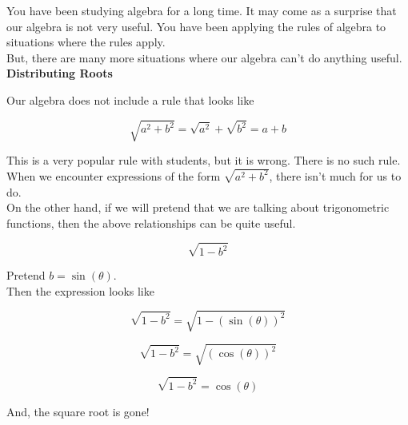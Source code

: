\documentclass{ximera}
\begin{document}
You have been studying algebra for a long time.  It may come as a surprise that our algebra is not very useful.  You have been applying the rules of algebra to situations where the rules apply. \\


But, there are many more situations where our algebra can't do anything useful. \\



\textbf{Distributing Roots}


Our algebra does not include a rule that looks like  

\[
\sqrt{a^2 + b^2} = \sqrt{a^2} + \sqrt{b^2} = a + b
\]


This is a very popular rule with students, but it is wrong.  There is no such rule. \\


When we encounter expressions of the form $\sqrt{a^2 + b^2}$, there isn't much for us to do. \\



On the other hand, if we will pretend that we are talking about trigonometric functions, then the above relationships can be quite useful. \\




\begin{example}


\[
\sqrt{1 - b^2} 
\]


Pretend $b = \sin(\theta)$. \\

Then the expression looks like

\[
\sqrt{1 - b^2} = \sqrt{1 - (\sin(\theta))^2}
\]


\[
\sqrt{1 - b^2} = \sqrt{(\cos(\theta))^2}
\]


\[
\sqrt{1 - b^2} = \cos(\theta)
\]



And, the square root is gone! \\





\end{example}
\end{document}
